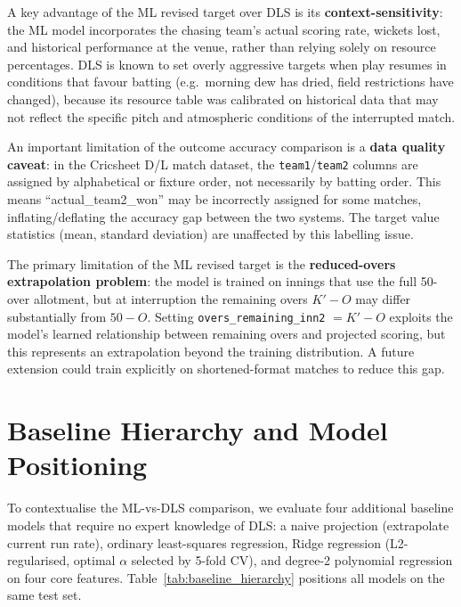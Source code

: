 \documentclass[12pt,a4paper,oneside]{report}
\begin{document}
A key advantage of the ML revised target over DLS is its \textbf{context-sensitivity}: the ML model incorporates the chasing team's actual scoring rate, wickets lost, and historical performance at the venue, rather than relying solely on resource percentages.  DLS is known to set overly aggressive targets when play resumes in conditions that favour batting (e.g.\ morning dew has dried, field restrictions have changed), because its resource table was calibrated on historical data that may not reflect the specific pitch and atmospheric conditions of the interrupted match.

An important limitation of the outcome accuracy comparison is a \textbf{data quality caveat}: in the Cricsheet D/L match dataset, the \texttt{team1}/\texttt{team2} columns are assigned by alphabetical or fixture order, not necessarily by batting order.  This means ``actual\_team2\_won'' may be incorrectly assigned for some matches, inflating/deflating the accuracy gap between the two systems.  The target value statistics (mean, standard deviation) are unaffected by this labelling issue.

The primary limitation of the ML revised target is the \textbf{reduced-overs extrapolation problem}: the model is trained on innings that use the full 50-over allotment, but at interruption the remaining overs $K' - O$ may differ substantially from $50 - O$.  Setting \texttt{overs\_remaining\_inn2} $= K' - O$ exploits the model's learned relationship between remaining overs and projected scoring, but this represents an extrapolation beyond the training distribution.  A future extension could train explicitly on shortened-format matches to reduce this gap.

\section{Baseline Hierarchy and Model Positioning}
\label{sec:baselines}

To contextualise the ML-vs-DLS comparison, we evaluate four additional baseline models that require no expert knowledge of DLS: a naive projection (extrapolate current run rate), ordinary least-squares regression, Ridge regression (L2-regularised, optimal $\alpha$ selected by 5-fold CV), and degree-2 polynomial regression on four core features.  Table~\ref{tab:baseline_hierarchy} positions all models on the same test set.
\end{document}
